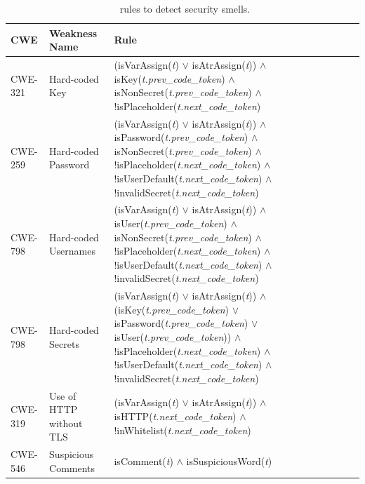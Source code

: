 \begin{table}[h]
  \small
  \centering
  \caption{\toolname\ rules to detect security smells.}
  \vspace{-2ex}
  \setlength{\tabcolsep}{3pt} %
  \renewcommand{\arraystretch}{0.9} %
      \begin{tabular}{p{1.3cm}p{3cm}p{12.5cm}} 
    \toprule
  \textbf{CWE} & \textbf{Weakness Name}	& \textbf{Rule} \\
  \midrule		
  CWE-321 & Hard-coded Key & 
    (isVarAssign(\textit{t}) $\vee$ isAtrAssign(\textit{t})) $\wedge$
    isKey(\textit{t.prev\_code\_token}) $\wedge$ 
    isNonSecret(\textit{t.prev\_code\_token}) $\wedge$ 
    !isPlaceholder(\textit{t.next\_code\_token}) \\\midrule
  CWE-259 & Hard-coded Password & 
    (isVarAssign(\textit{t}) $\vee$ isAtrAssign(\textit{t})) $\wedge$
    isPassword(\textit{t.prev\_code\_token}) $\wedge$ 
    isNonSecret(\textit{t.prev\_code\_token}) $\wedge$ 
    !isPlaceholder(\textit{t.next\_code\_token}) $\wedge$ 
    !isUserDefault(\textit{t.next\_code\_token}) $\wedge$
    !invalidSecret(\textit{t.next\_code\_token})\\\midrule
  CWE-798 & Hard-coded Usernames & 
    (isVarAssign(\textit{t}) $\vee$ isAtrAssign(\textit{t})) $\wedge$
    isUser(\textit{t.prev\_code\_token}) $\wedge$ 
    isNonSecret(\textit{t.prev\_code\_token}) $\wedge$ 
    !isPlaceholder(\textit{t.next\_code\_token}) $\wedge$ 
    !isUserDefault(\textit{t.next\_code\_token}) $\wedge$
    !invalidSecret(\textit{t.next\_code\_token}) \\\midrule
  CWE-798 & Hard-coded Secrets & 
    (isVarAssign(\textit{t}) $\vee$ isAtrAssign(\textit{t})) $\wedge$
    (isKey(\textit{t.prev\_code\_token}) $\vee$ 
    isPassword(\textit{t.prev\_code\_token}) $\vee$
    isUser(\textit{t.prev\_code\_token})) $\wedge$
    !isPlaceholder(\textit{t.next\_code\_token}) $\wedge$ 
    !isUserDefault(\textit{t.next\_code\_token}) $\wedge$
    !invalidSecret(\textit{t.next\_code\_token}) \\\midrule  
  CWE-319 & Use of HTTP without TLS & 
    (isVarAssign(\textit{t}) $\vee$ isAtrAssign(\textit{t})) $\wedge$
    isHTTP(\textit{t.next\_code\_token}) $\wedge$
    !inWhitelist(\textit{t.next\_code\_token})\\\midrule
  CWE-546 & Suspicious Comments & 
    isComment(\textit{t}) $\wedge$ 
    isSuspiciousWord(\textit{t})\\\midrule

\end{tabular}
\end{table}
